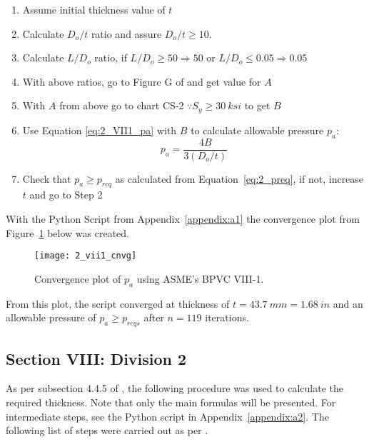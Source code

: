 \begin{enumerate}
	\item Assume initial thickness value of $t$
	\item Calculate $D_o/t$ ratio and assure $D_o/t \geq 10$.
	\item Calculate $L/D_o$ ratio, if $L/D_o \geq 50 \Rightarrow 50$ or  $L/D_o \leq 0.05 \Rightarrow 0.05$
	\item With above ratios, go to Figure G of \citep{ASMEbvpcIID} and get value for $A$
	\item With $A$ from above go to chart CS-2 $\because S_y \geq 30 \ ksi$ to get $B$
	\item Use Equation \ref{eq:2_VII1_pa} with $B$ to calculate allowable pressure $p_a$:
		\begin{equation}
			\label{eq:2_VII1_pa}
			p_a = \frac{4B}{3 \left(D_o/t\right)}
		\end{equation}
	\item Check that $p_a \geq p_{req}$ as calculated from Equation~\ref{eq:2_preq}, if not, increase $t$ and go to Step 2\\
	
\end{enumerate}

With the Python Script from Appendix~\ref{appendix:a1} the convergence plot from Figure~\ref{fig:2_vii1_cnvg} below was created.
\begin{figure}[H]
    \centering
    \texttt{[image: 2\_vii1\_cnvg]}
    \caption{Convergence plot of $p_a$ using ASME's BPVC VIII-1.}
    \label{fig:2_vii1_cnvg}
\end{figure}

From this plot, the script converged at thickness of $t = 43.7\ mm = 1.68\ in$ and an allowable pressure of $p_a\geq p_{reqs}$ after $n=119$ iterations. 


\subsection{Section VIII: Division 2}
As per subsection 4.4.5 of \citep{ASMEbvpcVII2}, the following procedure was used to calculate the required thickness. Note that only the main formulas will be presented. For intermediate steps, see  the Python script in Appendix~\ref{appendix:a2}. The following list of steps were carried out as per \citep{ASMEbvpcVII2}.

